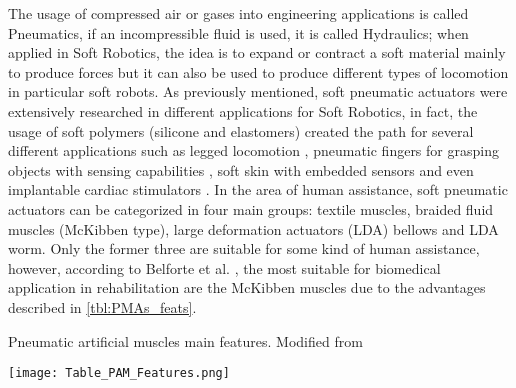 The usage of compressed air or gases into engineering applications is called Pneumatics, if an incompressible fluid is used, it is called Hydraulics; when applied in Soft Robotics, the idea is to expand or contract a soft material mainly to produce forces but it can also be used to produce different types of locomotion in particular soft robots. As previously mentioned, soft pneumatic actuators were extensively researched in different applications for Soft Robotics, in fact, the usage of soft polymers (silicone and elastomers) created the path for several different applications such as legged locomotion \cite{Florez2014}, pneumatic fingers for grasping objects with sensing capabilities \cite{Morrow2015}, soft skin with embedded sensors \cite{Sonar2016,Suh2014} and even implantable cardiac stimulators \cite{Roche2014}. In the area of human assistance, soft pneumatic actuators can be categorized in four main groups: textile muscles, braided fluid muscles (McKibben type), large deformation actuators (LDA) bellows and LDA worm. Only the former three are suitable for some kind of human assistance, however, according to Belforte et al. \cite{Belforte2014}, the most suitable for biomedical application in rehabilitation are the McKibben muscles due to the advantages described in \autoref{tbl:PMAs_feats}.
\begin{table}[htp!]
  \caption{Pneumatic artificial muscles main features. Modified from \cite{Belforte2014}}
  \label{tbl:PMAs_feats}
  \centering
  \texttt{[image: Table\_PAM\_Features.png]}
\end{table}

